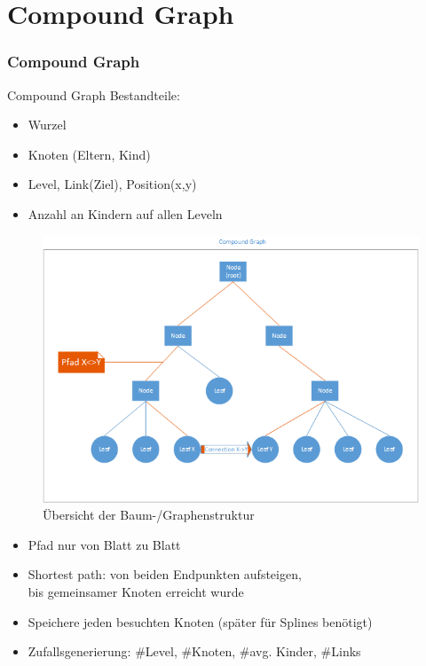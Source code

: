 \documentclass[11pt]{beamer}
\begin{document}
\section{Compound Graph}
\begin{frame}[allowframebreaks]
\frametitle{Compound Graph}

Compound Graph Bestandteile:
\begin{itemize} 
\item Wurzel
\item Knoten (Eltern, Kind)                                                                                                                       
\item Level, Link(Ziel), Position(x,y)
\item Anzahl an Kindern auf allen Leveln
\end{itemize}

\begin{figure}
\centering
\includegraphics[width=0.79\linewidth]{./Compound_overview}
\caption[Compound_overview]{Übersicht der Baum-/Graphenstruktur}
\label{fig:Compound_overview}
\end{figure}

\framebreak
\begin{itemize} 
\item Pfad nur von Blatt zu Blatt
\item Shortest path: von beiden Endpunkten aufsteigen, \\ bis gemeinsamer Knoten erreicht wurde
\item Speichere jeden besuchten Knoten (später für Splines benötigt)
\item Zufallsgenerierung: \#Level, \#Knoten, \#avg. Kinder, \#Links
\end{itemize}



\end{frame}
\end{document}
